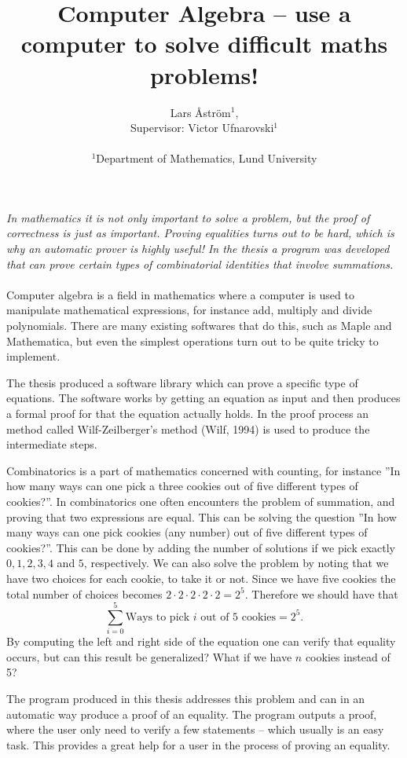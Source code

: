 \documentclass[letterpaper]{article}
\title{Computer Algebra -- use a computer to solve difficult maths problems!}
\author{Lars Åström$^{1}$, \\ Supervisor: Victor Ufnarovski$^{1}$\\
\mbox{}\\
$^1$Department of Mathematics, Lund University
}
\begin{document}
\maketitle
\Large
\textit{
In mathematics it is not only important to solve a problem, but the proof of correctness is just as important. Proving equalities turns out to be hard, which is why an automatic prover is highly useful! In the thesis a program was developed that can prove certain types of combinatorial identities that involve summations.
}
\\ \\
\normalsize
Computer algebra is a field in mathematics where a computer is used to manipulate mathematical expressions, for instance add, multiply and divide polynomials. There are many existing softwares that do this, such as Maple and Mathematica, but even the simplest operations turn out to be quite tricky to implement.

The thesis produced a software library which can prove a specific type of equations. The software works by getting an equation as input and then produces a formal proof for that the equation actually holds. In the proof process an method called Wilf-Zeilberger's method (Wilf, 1994) is used to produce the intermediate steps.

Combinatorics is a part of mathematics concerned with counting, for instance ''In how many ways can one pick a three cookies out of five different types of cookies?''. In combinatorics one often encounters the problem of summation, and proving that two expressions are equal. This can be solving the question ''In how many ways can one pick cookies (any number) out of five different types of cookies?''. This can be done by adding the number of solutions if we pick exactly $0,1,2,3,4$ and $5$, respectively. We can also solve the problem by noting that we have two choices for each cookie, to take it or not. Since we have five cookies the total number of choices becomes $2\cdot 2\cdot 2\cdot 2\cdot 2=2^5$. Therefore we should have that $$\sum_{i=0}^5 \text{Ways to pick } i \text{ out of 5 cookies}=2^5.$$ By computing the left and right side of the equation one can verify that equality occurs, but can this result be generalized? What if we have $n$ cookies instead of 5?

The program produced in this thesis addresses this problem and can in an automatic way produce a proof of an equality. The program outputs a proof, where the user only need to verify a few statements -- which usually is an easy task. This provides a great help for a user in the process of proving an equality.
\end{document}
